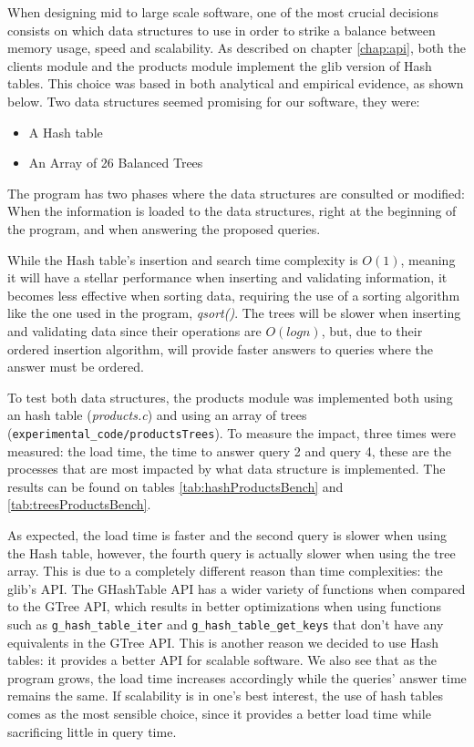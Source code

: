 \documentclass[a4paper]{report}
\begin{document}
When designing mid to large scale software, one of the most crucial decisions consists on which data structures to use in order to strike a balance between memory usage, speed and scalability.
As described on chapter \ref{chap:api}, both the clients module and the products module implement the glib version of Hash tables.
This choice was based in both analytical and empirical evidence, as shown below.
Two data structures seemed promising for our software, they were:
\begin{itemize}
    \item A Hash table
    \item An Array of 26 Balanced Trees
\end{itemize}
The program has two phases where the data structures are consulted or modified: When the information
is loaded to the data structures, right at the beginning of the program, and when answering the proposed queries.

While the Hash table's insertion and search time complexity is  $O(1)$, meaning it will have a stellar performance when inserting and validating information, it becomes less effective when sorting data, requiring the use of a sorting algorithm like the one used in the program,  \textit{qsort()}. The trees will be slower when inserting and validating data since their operations are $O(log n)$, but, due to their ordered insertion algorithm, will provide faster answers to queries where the answer must be ordered. 

To test both data structures, the products module was implemented both using an hash table (\textit{products.c}) and using an array of trees (\texttt{experimental\_code/productsTrees}). To measure the impact, three times were measured: the load time, the time to answer query 2 and query 4, these are the processes that are most impacted by what data structure is implemented. The results can be found on tables  \ref{tab:hashProductsBench} and  \ref{tab:treesProductsBench}.

As expected, the load time is faster and the second query is slower when using the Hash table, however, the fourth query is actually slower when using the tree array. This is due to a completely different reason than time complexities: the glib's API. The GHashTable API has a wider variety of functions when compared to the GTree API, which results in better optimizations when using functions such as \texttt{g\_hash\_table\_iter} and \texttt{g\_hash\_table\_get\_keys} that don't have any equivalents in the GTree API. This is another reason we decided to use Hash tables: it provides a better API for scalable software. We also see that as the program grows, the load time increases accordingly while the queries' answer time remains the same. If scalability is in one's best interest, the use of hash tables  comes as the most sensible choice, since it provides a better load time while sacrificing little in query time.
\end{document}
